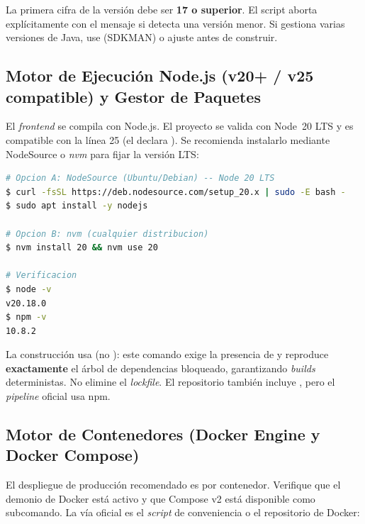 \begin{VerificacionOK}
La primera cifra de la versión debe ser \textbf{17 o superior}. El script
 aborta explícitamente con el mensaje  si
detecta una versión menor. Si gestiona varias versiones de Java, use  (SDKMAN) o ajuste  antes de construir.
\end{VerificacionOK}

\subsection[Motor Node.js y Gestor de Paquetes]{Motor de Ejecución Node.js (v20+ / v25 compatible) y Gestor de Paquetes}%
\label{subsec:node}

El \textit{frontend} se compila con Node.js. El proyecto se valida con Node~20 LTS y es
compatible con la línea 25 (el  declara
). Se recomienda instalarlo mediante NodeSource o
\textit{nvm} para fijar la versión LTS:\par

\begin{lstlisting}[language=bash]
# Opcion A: NodeSource (Ubuntu/Debian) -- Node 20 LTS
$ curl -fsSL https://deb.nodesource.com/setup_20.x | sudo -E bash -
$ sudo apt install -y nodejs

# Opcion B: nvm (cualquier distribucion)
$ nvm install 20 && nvm use 20

# Verificacion
$ node -v
v20.18.0
$ npm -v
10.8.2
\end{lstlisting}

\begin{AvisoPrecaucion}
La construcción usa  (no ): este comando exige la
presencia de  y reproduce \textbf{exactamente} el árbol de
dependencias bloqueado, garantizando \textit{builds} deterministas. No elimine el
\textit{lockfile}. El repositorio también incluye , pero el
\textit{pipeline} oficial usa npm.
\end{AvisoPrecaucion}

\subsection{Motor de Contenedores (Docker Engine y Docker Compose)}%
\label{subsec:docker}

El despliegue de producción recomendado es por contenedor. Verifique que el demonio de
Docker está activo y que Compose v2 está disponible como subcomando. La vía oficial es el
\textit{script} de conveniencia o el repositorio de Docker:\par


